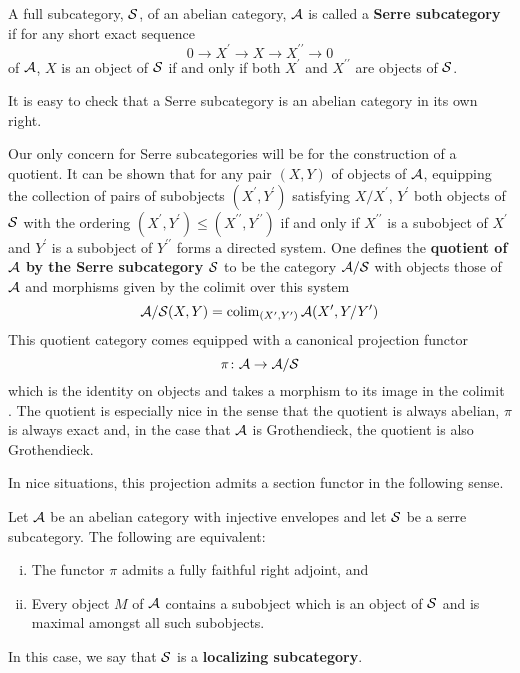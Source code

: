 \begin{definition}
  A full subcategory, \(\mathcal{S}\), of an abelian category, \(\mathcal{A}\) is called a \textbf{Serre subcategory} if for any short exact sequence
  \[0 \to X^\prime \to X \to X^{\prime\prime} \to 0\]
  of \(\mathcal{A}\), \(X\) is an object of \(\mathcal{S}\) if and only if both \(X^\prime\) and \(X^{\prime\prime}\) are objects of \(\mathcal{S}\).
\end{definition}

\begin{remark}
  It is easy to check that a Serre subcategory is an abelian category in its own right.
\end{remark}

Our only concern for Serre subcategories will be for the construction of a quotient.
It can be shown that for any pair \((X,Y)\) of objects of \(\mathcal{A}\), equipping the collection of pairs of subobjects \((X^\prime, Y^\prime)\) satisfying \(X/X^\prime\), \(Y^\prime\) both objects of \(\mathcal{S}\) with the ordering \((X^\prime, Y^\prime) \leq (X^{\prime\prime}, Y^{\prime\prime})\) if and only if \(X^{\prime\prime}\) is a subobject of \(X^\prime\) and \(Y^\prime\) is a subobject of \(Y^{\prime\prime}\) forms a directed system.
One defines the \textbf{quotient of \(\mathcal{A}\) by the Serre subcategory \(\mathcal{S}\)} to be the category \(\mathcal{A}/\mathcal{S}\) with objects those of \(\mathcal{A}\) and morphisms given by the colimit over this system
\[\mathcal{A}/\mathcal{S}(X,Y) = \operatorname{colim}_{(X^\prime, Y^\prime)} \mathcal{A}(X^\prime, Y/Y^\prime)\]
This quotient category comes equipped with a canonical projection functor
\[\pi \colon \mathcal{A} \to \mathcal{A}/\mathcal{S}\]
which is the identity on objects and takes a morphism to its image in the colimit \parencite[Cor. 1, III.1]{DCA62}.
The quotient is especially nice in the sense that the quotient is always abelian, \(\pi\) is always exact and, in the case that \(\mathcal{A}\) is Grothendieck, the quotient is also Grothendieck.

In nice situations, this projection admits a section functor in the following sense.

\begin{proposition}\label{prop: existence of serre functor}
  Let \(\mathcal{A}\) be an abelian category with injective envelopes and let \(\mathcal{S}\) be a serre subcategory.
  The following are equivalent:
  \begin{enumerate}[(i)]
  \item
    The functor \(\pi\) admits a fully faithful right adjoint, and
  \item
    Every object \(M\) of \(\mathcal{A}\) contains a subobject which is an object of \(\mathcal{S}\) and is maximal amongst all such subobjects.
  \end{enumerate}
  In this case, we say that \(\mathcal{S}\) is a \textbf{localizing subcategory}.
\end{proposition}

